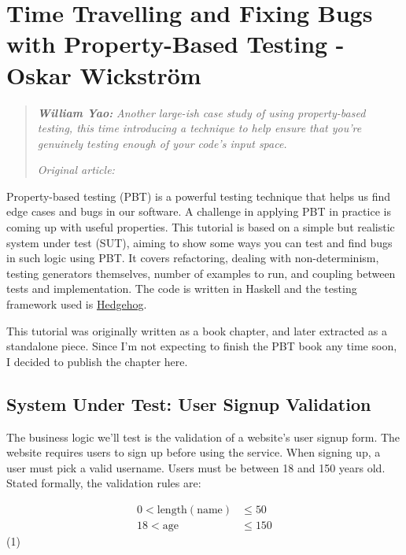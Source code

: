\chapter{Time Travelling and Fixing Bugs with Property-Based Testing - Oskar Wickström}

\begin{quotation}
\noindent\textit{\textbf{William Yao:}}
\textit{Another large-ish case study of using property-based testing, this time introducing a technique to help ensure that you’re genuinely testing enough of your code’s input space.}

\vspace{\baselineskip}
\noindent\textit{Original article: \cite{time_travelling}}
\end{quotation}


Property-based testing (PBT) is a powerful testing technique that helps
us find edge cases and bugs in our software. A challenge in applying PBT
in practice is coming up with useful properties. This tutorial is based
on a simple but realistic system under test (SUT), aiming to show some
ways you can test and find bugs in such logic using PBT. It covers
refactoring, dealing with non-determinism, testing generators
themselves, number of examples to run, and coupling between tests and
implementation. The code is written in Haskell and the testing framework
used is \href{http://hackage.haskell.org/package/hedgehog}{Hedgehog}.

This tutorial was originally written as a book chapter, and later
extracted as a standalone piece. Since I'm not expecting to finish the
PBT book any time soon, I decided to publish the chapter here.

\section{System Under Test: User Signup
Validation}\label{system-under-test-user-signup-validation}

The business logic we'll test is the validation of a website's user
signup form. The website requires users to sign up before using the
service. When signing up, a user must pick a valid username. Users must
be between 18 and 150 years old.
Stated formally, the validation rules are:

\begin{align*} 0 < \text{length}(\text{name}) &\leq 50 \\ 18 < \text{age} &\leq 150 \end{align*} \qquad(1)

